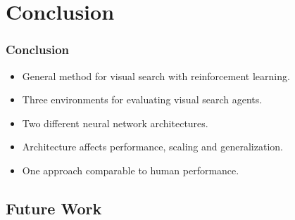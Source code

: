 \section{Conclusion}

\begin{frame}
    \frametitle{Conclusion}

    \begin{itemize}
        \item General method for visual search with reinforcement learning.
        \item Three environments for evaluating visual search agents.
        \item Two different neural network architectures.
        \item Architecture affects performance, scaling and generalization.
        \item One approach comparable to human performance.
    \end{itemize}
\end{frame}

\subsection{Future Work}

